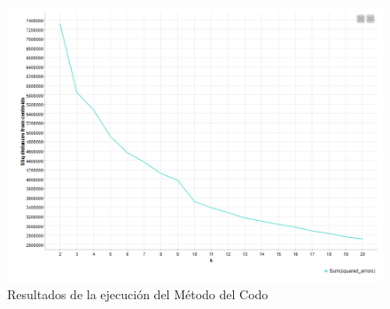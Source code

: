 \begin{figure}[H]
	\centering
	\includegraphics[width=0.7\linewidth]{"figuras/Jenn/elbow method"}
	\caption{Resultados de la ejecución del Método del Codo}
	\label{fig:elbow-method}
\end{figure}

